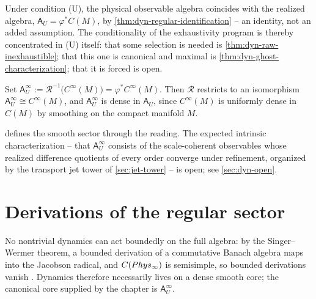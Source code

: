 \begin{corollary}
	\label{cor:dyn-exhaustivity}
	Under condition \textup{(U)}, the physical observable algebra
	coincides with the realized algebra,
	\(\mathsf A_U=\varphi^*C(M)\), by
	\cref{thm:dyn-regular-identification} -- an identity, not an added
	assumption. The conditionality of the exhaustivity program is
	thereby concentrated in \textup{(U)} itself: that some selection is
	needed is \cref{thm:dyn-raw-inexhaustible}; that this one is
	canonical and maximal is \cref{thm:dyn-ghost-characterization};
	that it is forced is open.
\end{corollary}

\begin{corollary}
	\label{cor:dyn-smooth-sector}
	Set \(\mathsf A_U^\infty:=\mathcal R^{-1}\bigl(C^\infty(M)\bigr)
	=\varphi^*C^\infty(M)\).
	Then \(\mathcal R\) restricts to an isomorphism
	\(\mathsf A_U^\infty\cong C^\infty(M)\), and
	\(\mathsf A_U^\infty\) is dense in \(\mathsf A_U\), since
	\(C^\infty(M)\) is uniformly dense in \(C(M)\) by smoothing on the
	compact manifold \(M\).
\end{corollary}

\begin{remark}
	\label{rem:dyn-smooth-intrinsic}
	 defines the smooth sector through the
	reading. The expected intrinsic characterization -- that
	\(\mathsf A_U^\infty\) consists of the scale-coherent observables
	whose realized difference quotients of every order converge under
	refinement, organized by the transport jet tower of
	\cref{sec:jet-tower} -- is open; see \cref{sec:dyn-open}.
\end{remark}

\section{Derivations of the regular sector}
\label{sec:dyn-derivations}
\begin{remark}
	\label{rem:dyn-singer-wermer}
	No nontrivial dynamics can act boundedly on the full algebra: by
	the Singer--Wermer theorem, a bounded derivation of a commutative
	Banach algebra maps into the Jacobson radical, and
	\(C(Phys_\infty)\) is semisimple, so bounded derivations vanish
	\cite{SingerWermer1955}.
	Dynamics therefore necessarily lives on a dense smooth core; the
	canonical core supplied by the chapter is
	\(\mathsf A_U^\infty\).
\end{remark}

